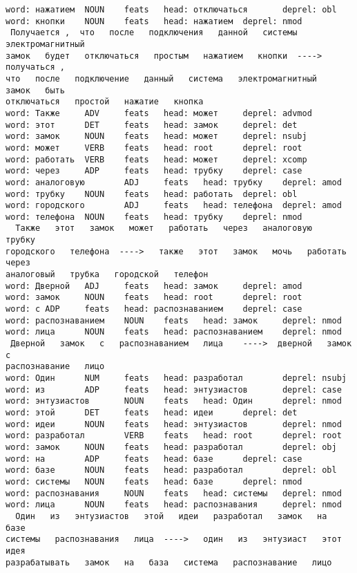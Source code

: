 \documentclass[11pt]{article}
\begin{document}
\begin{Verbatim}[commandchars=\\\{\}]
word: нажатием  NOUN    feats   head: отключаться       deprel: obl
word: кнопки    NOUN    feats   head: нажатием  deprel: nmod
 Получается ,  что   после   подключения   данной   системы   электромагнитный
замок   будет   отключаться   простым   нажатием   кнопки  ---->  получаться ,
что   после   подключение   данный   система   электромагнитный   замок   быть
отключаться   простой   нажатие   кнопка
word: Также     ADV     feats   head: может     deprel: advmod
word: этот      DET     feats   head: замок     deprel: det
word: замок     NOUN    feats   head: может     deprel: nsubj
word: может     VERB    feats   head: root      deprel: root
word: работать  VERB    feats   head: может     deprel: xcomp
word: через     ADP     feats   head: трубку    deprel: case
word: аналоговую        ADJ     feats   head: трубку    deprel: amod
word: трубку    NOUN    feats   head: работать  deprel: obl
word: городского        ADJ     feats   head: телефона  deprel: amod
word: телефона  NOUN    feats   head: трубку    deprel: nmod
  Также   этот   замок   может   работать   через   аналоговую   трубку
городского   телефона  ---->   также   этот   замок   мочь   работать   через
аналоговый   трубка   городской   телефон
word: Дверной   ADJ     feats   head: замок     deprel: amod
word: замок     NOUN    feats   head: root      deprel: root
word: с ADP     feats   head: распознаванием    deprel: case
word: распознаванием    NOUN    feats   head: замок     deprel: nmod
word: лица      NOUN    feats   head: распознаванием    deprel: nmod
 Дверной   замок   с   распознаванием   лица    ---->  дверной   замок   с
распознавание   лицо
word: Один      NUM     feats   head: разработал        deprel: nsubj
word: из        ADP     feats   head: энтузиастов       deprel: case
word: энтузиастов       NOUN    feats   head: Один      deprel: nmod
word: этой      DET     feats   head: идеи      deprel: det
word: идеи      NOUN    feats   head: энтузиастов       deprel: nmod
word: разработал        VERB    feats   head: root      deprel: root
word: замок     NOUN    feats   head: разработал        deprel: obj
word: на        ADP     feats   head: базе      deprel: case
word: базе      NOUN    feats   head: разработал        deprel: obl
word: системы   NOUN    feats   head: базе      deprel: nmod
word: распознавания     NOUN    feats   head: системы   deprel: nmod
word: лица      NOUN    feats   head: распознавания     deprel: nmod
  Один   из   энтузиастов   этой   идеи   разработал   замок   на   базе
системы   распознавания   лица  ---->   один   из   энтузиаст   этот   идея
разрабатывать   замок   на   база   система   распознавание   лицо

\end{Verbatim}
\end{document}

